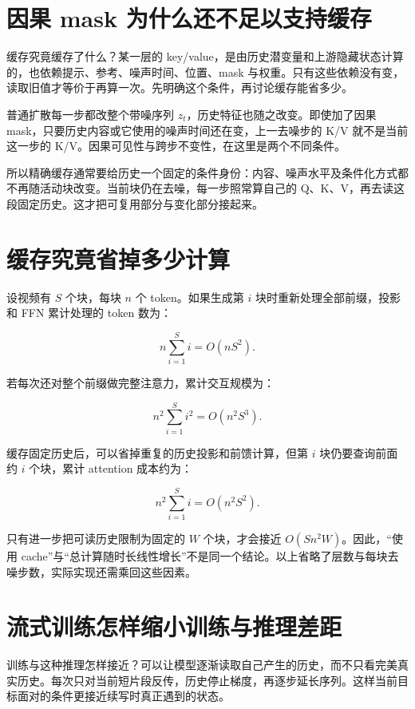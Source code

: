 \section{因果 mask 为什么还不足以支持缓存}\label{seedance-m06-ux56e0ux679c-mask-ux4e3aux4ec0ux4e48ux8fd8ux4e0dux8db3ux4ee5ux652fux6301ux7f13ux5b58}

缓存究竟缓存了什么？某一层的 key/value，是由历史潜变量和上游隐藏状态计算的，也依赖提示、参考、噪声时间、位置、mask 与权重。只有这些依赖没有变，读取旧值才等价于再算一次。先明确这个条件，再讨论缓存能省多少。

普通扩散每一步都改整个带噪序列 \(z_t\)，历史特征也随之改变。即使加了因果 mask，只要历史内容或它使用的噪声时间还在变，上一去噪步的 K/V 就不是当前这一步的 K/V。因果可见性与跨步不变性，在这里是两个不同条件。

所以精确缓存通常要给历史一个固定的条件身份：内容、噪声水平及条件化方式都不再随活动块改变。当前块仍在去噪，每一步照常算自己的 Q、K、V，再去读这段固定历史。这才把可复用部分与变化部分接起来。

\section{缓存究竟省掉多少计算}\label{seedance-m06-ux7f13ux5b58ux7a76ux7adfux7701ux6389ux591aux5c11ux8ba1ux7b97}

设视频有 \(S\) 个块，每块 \(n\) 个 token。如果生成第 \(i\) 块时重新处理全部前缀，投影和 FFN 累计处理的 token 数为：

\[
n\sum_{i=1}^{S}i=O(nS^2).
\]

若每次还对整个前缀做完整注意力，累计交互规模为：

\[
n^2\sum_{i=1}^{S}i^2=O(n^2S^3).
\]

缓存固定历史后，可以省掉重复的历史投影和前馈计算，但第 \(i\) 块仍要查询前面约 \(i\) 个块，累计 attention 成本约为：

\[
n^2\sum_{i=1}^{S}i=O(n^2S^2).
\]

只有进一步把可读历史限制为固定的 \(W\) 个块，才会接近 \(O(Sn^2W)\)。因此，``使用 cache''与``总计算随时长线性增长''不是同一个结论。以上省略了层数与每块去噪步数，实际实现还需乘回这些因素。

\section{流式训练怎样缩小训练与推理差距}\label{seedance-m06-ux6d41ux5f0fux8badux7ec3ux600eux6837ux7f29ux5c0fux8badux7ec3ux4e0eux63a8ux7406ux5deeux8ddd}

训练与这种推理怎样接近？可以让模型逐渐读取自己产生的历史，而不只看完美真实历史。每次只对当前短片段反传，历史停止梯度，再逐步延长序列。这样当前目标面对的条件更接近续写时真正遇到的状态。

